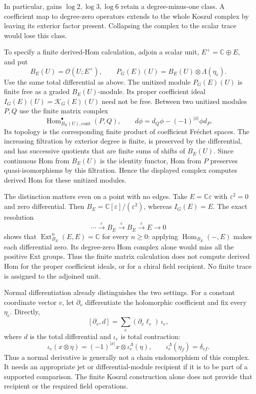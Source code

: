 In particular, gains $\log2,\log3,\log6$ retain a degree-minus-one
class. A coefficient map to degree-zero operators extends to the
whole Koszul complex by leaving its exterior factor present.
Collapsing the complex to the scalar trace would lose this class.

To specify a finite derived-Hom calculation, adjoin a scalar unit,
$E^+=\mathbb C\oplus E$, and put
\[
 B_E(U)=\mathcal O(U;E^+),\qquad
 P_G(E)(U)=B_E(U)\otimes\Lambda(\eta_e).
\]
Use the same total differential as above. The unitized module
$P_G(E)(U)$ is finite free as a graded $B_E(U)$-module.
Its proper coefficient ideal
$I_G(E)(U)=\mathcal K_G(E)(U)$ need not be free.
Between two unitized modules $P,Q$ use the finite matrix complex
\begin{equation}\label{nwc:eq:continuous-hom}
 \operatorname{Hom}_{B_E(U),\mathrm{cont}}^\bullet(P,Q),
 \qquad d\phi=d_Q\phi-(-1)^{|\phi|}\phi d_P.
\end{equation}
Its topology is the corresponding finite product of coefficient
Fr\'echet spaces.
The increasing filtration by exterior degree is finite, is preserved
by the differential, and has successive quotients that are finite sums
of shifts of $B_E(U)$. Since continuous Hom from $B_E(U)$ is the
identity functor, Hom from $P$ preserves quasi-isomorphisms by this
filtration. Hence the displayed complex computes derived Hom for
these unitized modules.

The distinction matters even on a point with no edges.
Take $E=\mathbb C\varepsilon$ with $\varepsilon^2=0$ and zero
differential. Then $B_E=\mathbb C[\varepsilon]/(\varepsilon^2)$,
whereas $I_G(E)=E$. The exact resolution
\[
 \cdots\xrightarrow{\varepsilon}B_E
       \xrightarrow{\varepsilon}B_E
       \xrightarrow{\varepsilon}E\longrightarrow0
\]
shows that $\operatorname{Ext}_{B_E}^n(E,E)=\mathbb C$ for every
$n\geq0$: applying $\operatorname{Hom}_{B_E}(-,E)$ makes each
differential zero. Its degree-zero Hom complex alone would miss all
the positive Ext groups. Thus the finite matrix calculation does not
compute derived Hom for the proper coefficient ideals, or for a
chiral field recipient. No finite trace is assigned to the adjoined unit.

Normal differentiation already distinguishes the two settings.
For a constant coordinate vector $v$, let $\partial_v$ differentiate
the holomorphic coefficient and fix every $\eta_e$. Directly,
\begin{equation}\label{nwc:eq:normal-defect}
 [\partial_v,d]
       =\sum_e(\partial_v\ell_e)\,\iota_e,
\end{equation}
where $d$ is the total differential and $\iota_e$ is total contraction:
\[
 \iota_e(x\otimes\eta)=(-1)^{|x|}x\otimes\iota_e^{\Lambda}(\eta),
 \qquad \iota_e^{\Lambda}(\eta_f)=\delta_{ef}.
\]
Thus a normal derivative is generally not a chain endomorphism of
this complex. It needs an appropriate jet or differential-module
recipient if it is to be part of a supported comparison.
The finite Koszul construction alone does not provide that recipient
or the required field operations.

